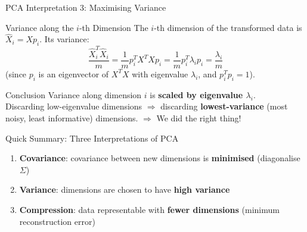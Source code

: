 \documentclass{beamer}
\begin{document}
\begin{frame}[shrink=10]{PCA Interpretation 3: Maximising Variance}
  \begin{block}{Variance along the $i$-th Dimension}
    The $i$-th dimension of the transformed data is $\hat{X}_i = Xp_i$.
    Its variance:
    \[
      \frac{\hat{X}_i^T\hat{X}_i}{m}
        = \frac{1}{m}p_i^T X^T X p_i
        = \frac{1}{m}p_i^T\lambda_i p_i
        = \frac{\lambda_i}{m}
    \]
    (since $p_i$ is an eigenvector of $X^TX$ with eigenvalue
    $\lambda_i$, and $p_i^Tp_i = 1$).
  \end{block}

  \medskip

  \begin{block}{Conclusion}
    Variance along dimension $i$ is \textbf{scaled by eigenvalue
    $\lambda_i$}.\\[4pt]
    Discarding low-eigenvalue dimensions
    $\Rightarrow$ discarding \textbf{lowest-variance} (most noisy,
    least informative) dimensions.
    $\Rightarrow$ We did the right thing!
  \end{block}

  \medskip

  \begin{block}{Quick Summary: Three Interpretations of PCA}
    \begin{enumerate}\setlength\itemsep{4pt}
      \item \textbf{Covariance}: covariance between new dimensions is
            \textbf{minimised} (diagonalise $\Sigma$)
      \item \textbf{Variance}: dimensions are chosen to have
            \textbf{high variance}
      \item \textbf{Compression}: data representable with
            \textbf{fewer dimensions}
            (minimum reconstruction error)
    \end{enumerate}
  \end{block}
\end{frame}
\end{document}
